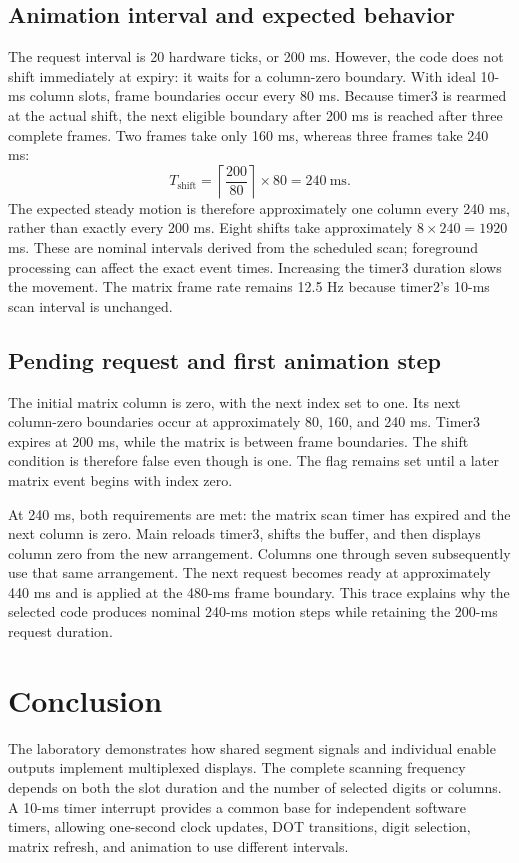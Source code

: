 \documentclass[a4paper]{article}
\newcommand{\code}[1]{\texttt{\detokenize{#1}}}
\newcommand{\topic}[1]{\subsection{#1}}
\begin{document}
\topic{Animation interval and expected behavior}
The request interval is 20 hardware ticks, or 200 ms. However, the code does
not shift immediately at expiry: it waits for a column-zero boundary. With
ideal 10-ms column slots, frame boundaries occur every 80 ms. Because timer3
is rearmed at the actual shift, the next eligible boundary after 200 ms is
reached after three complete frames. Two frames take only 160 ms, whereas
three frames take 240 ms:
\[
T_{\mathrm{shift}}=
\left\lceil\frac{200}{80}\right\rceil\times80
=240\ \mathrm{ms}.
\]
The expected steady motion is therefore approximately one column every
240 ms, rather than exactly every 200 ms. Eight shifts take approximately
\(8\times240=1920\) ms. These are nominal intervals derived from the scheduled
scan; foreground processing can affect the exact event times. Increasing the
timer3 duration slows the movement. The matrix frame rate remains 12.5 Hz
because timer2's 10-ms scan interval is unchanged.

\topic{Pending request and first animation step}
The initial matrix column is zero, with the next index set to one. Its next
column-zero boundaries occur at approximately 80, 160, and 240 ms. Timer3
expires at 200 ms, while the matrix is between frame boundaries. The shift
condition is therefore false even though \code{timer3_flag} is one. The flag
remains set until a later matrix event begins with index zero.

At 240 ms, both requirements are met: the matrix scan timer has expired and
the next column is zero. Main reloads timer3, shifts the buffer, and then
displays column zero from the new arrangement. Columns one through seven
subsequently use that same arrangement. The next request becomes ready at
approximately 440 ms and is applied at the 480-ms frame boundary. This trace
explains why the selected code produces nominal 240-ms motion steps while
retaining the 200-ms request duration.

\section*{Conclusion}
The laboratory demonstrates how shared segment signals and individual enable
outputs implement multiplexed displays. The complete scanning frequency depends
on both the slot duration and the number of selected digits or columns. A
10-ms timer interrupt provides a common base for independent software timers,
allowing one-second clock updates, DOT transitions, digit selection, matrix
refresh, and animation to use different intervals.
\end{document}
